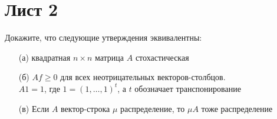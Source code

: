\section{Лист 2}
    \begin{prob}
        Докажите, что следующие утверждения эквивалентны:
        \begin{itemize}
        \item[(а)] квадратная $n \times n$ матрица $A$ стохастическая
        \item[(б)] $Af \geqslant 0$ для всех неотрицательных векторов-столбцов.\\
        $A1 = 1$, где $1 = (1, \ldots, 1)^{t}$, а $t$ обозначает транспонирование
        \item[(в)] Если $A$ вектор-строка $\mu$ распределение, то $\mu A$ тоже распределение
        \end{itemize}
    \end{prob}
